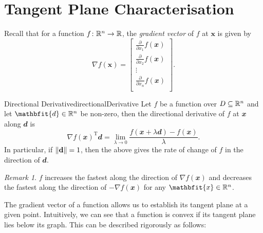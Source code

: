 \documentclass[math, code]{amznotes}
\theoremstyle{remark}
\newtheorem*{remark}{Remark}
\begin{document}
\section{Tangent Plane Characterisation}
Recall that for a function $f \colon \mathbb{R}^n \to \mathbb{R}$, the \textit{gradient vector} of $f$ at $\mathbf{x}$ is given by
\begin{equation*}
    \nabla f(\mathbf{x}) = \begin{bmatrix}
        \frac{\partial}{\partial x_1}f(\mathbfit{x}) \\
        \frac{\partial}{\partial x_2}f(\mathbfit{x}) \\
        \vdots \\
        \frac{\partial}{\partial x_n}f(\mathbfit{x}) \\
    \end{bmatrix}.
\end{equation*}
\begin{probox}{Directional Derivative}{directionalDerivative}
    Let $f$ be a function over $D \subseteq \mathbb{R}^n$ and let $\mathbfit{d} \in \R^n$ be non-zero, then the directional derivative of $f$ at $\mathbfit{x}$ along $\mathbfit{d}$ is
    \begin{equation*}
        \nabla f(\mathbfit{x})^{\mathrm{T}}\mathbfit{d} = \lim_{\lambda \to 0}\frac{f(\mathbfit{x} + \lambda\mathbfit{d}) - f(\mathbfit{x})}{\lambda}.
    \end{equation*}
    In particular, if ${\left\lVert {\mathbf{d}} \right\rVert} = 1$, then the above gives the rate of change of $f$ in the direction of $\mathbfit{d}$.
\end{probox}
\begin{notebox}
    \begin{remark}
        $f$ increases the fastest along the direction of $\nabla f(\mathbfit{x})$ and decreases the fastest along the direction of $-\nabla f(\mathbfit{x})$ for any $\mathbfit{x} \in \R^n$.
    \end{remark}
\end{notebox}
The gradient vector of a function allows us to establish its tangent plane at a given point. Intuitively, we can see that a function is convex if its tangent plane lies below its graph. This can be described rigorously as follows:
\end{document}
